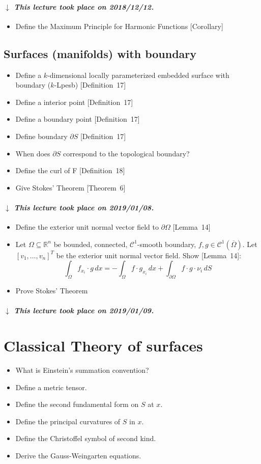 \documentclass{article}
\numberwithin{lecref}{section}
\newcommand{\dateref}[1]{%
  \begin{mdframed}[backgroundcolor=gray!10,innerbottommargin=0pt,innertopmargin=0pt]
    \paragraph{\textit{$\downarrow$ This lecture took place on #1.}}%
  \end{mdframed}%
}
\begin{document}
\dateref{2018/12/12}

\begin{itemize}
  \item Define the Maximum Principle for Harmonic Functions [Corollary]
\end{itemize}

\subsection*{Surfaces (manifolds) with boundary}

\begin{itemize}
  \item Define a $k$-dimensional locally parameterized embedded surface with boundary ($k$-Lpesb) [Definition~17]
  \item Define a interior point [Definition~17]
  \item Define a boundary point [Definition~17]
  \item Define boundary $\partial S$ [Definition~17]
  \item When does $\partial S$ correspond to the topological boundary?
  \item Define the curl of F [Definition~18]
  \item Give Stokes' Theorem [Theorem~6]
\end{itemize}

\dateref{2019/01/08}

\begin{itemize}
  \item Define the exterior unit normal vector field to $\partial \Omega$ [Lemma~14]
  \item Let $\Omega \subseteq \mathbb R^n$ be bounded, connected, $\mathcal C^1$-smooth boundary, $f, g \in \mathcal C^1(\overline \Omega)$. Let $[v_1, \dots, v_n]^T$ be the exterior unit normal vector field. Show [Lemma~14]:
    \[ \int_\Omega f_{x_i} \cdot g \, dx = -\int_{\Omega} f \cdot g_{x_i} \, dx + \int_{\partial \Omega} f \cdot g \cdot \nu_i \, dS \]
  \item Prove Stokes' Theorem
\end{itemize}

\dateref{2019/01/09}

\section*{Classical Theory of surfaces}

\begin{itemize}
  \item What is Einstein's summation convention?
  \item Define a metric tensor.
  \item Define the second fundamental form on $S$ at $x$.
  \item Define the principal curvatures of $S$ in $x$.
  \item Define the Christoffel symbol of second kind.
  \item Derive the Gauss-Weingarten equations.
\end{itemize}
\end{document}
